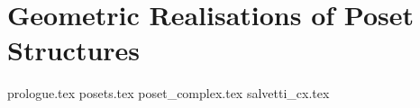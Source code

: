 \documentclass[class=article, crop=false]{standalone}
\begin{document}
\section{Geometric Realisations of Poset Structures}
{prologue.tex}
{posets.tex}
{poset_complex.tex}
{salvetti_cx.tex}
\end{document}
